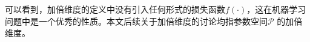 可以看到，加倍维度的定义中没有引入任何形式的损失函数$f(\cdot)$，这在机器学习问题中是一个优秀的性质。本文后续关于加倍维度的讨论均指参数空间$\mathcal{P}$
的加倍维度。










